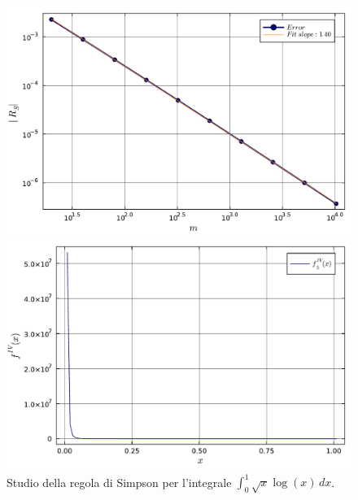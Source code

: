 \documentclass[letterpaper, 12pt]{article}
\numberwithin{equation}{section}    %
\begin{document}
\begin{figure}[!ht]
    \centering
    \begin{minipage}[b]{0.47\textwidth}
        \includegraphics[width=\textwidth]{5145.pdf}
    \end{minipage}
    \hspace{0.5cm}
    \begin{minipage}[b]{0.47\textwidth}
        \includegraphics[width=\textwidth]{5145_2.pdf}
    \end{minipage}
    \caption{Studio della regola di Simpson per l'integrale $\int_0^1 \sqrt{x} \log(x) \, dx$.}
    \label{fig:es5_1_4_5}
\end{figure}
\end{document}

